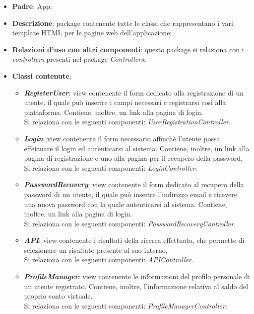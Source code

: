 \begin{itemize}
	\item \textbf{Padre}: App;
	
	\item \textbf{Descrizione}: package contenente tutte le classi che rappresentano i vari template HTML per le pagine web dell'applicazione;
	
	\item \textbf{Relazioni d’uso con altri componenti}: questo package si relaziona con i \textit{controllers} presenti nel package \textit{Controllers};
	
	\item \textbf{Classi contenute}:
	\begin{itemize}
		\item \textbf{\textit{RegisterUser}}: view contenente il form dedicato alla registrazione di un utente, il quale può inserire i campi necessari e registrarsi così alla piattaforma. Contiene, inoltre, un link alla pagina di login.\\
		Si relaziona con le seguenti componenti: \textit{UserRegistrationController}.
		
		\item \textbf{\textit{Login}}: view contenente il form necessario affinchè l'utente possa effettuare il login ed autenticarsi al sistema. Contiene, inoltre, un link alla pagina di registrazione e uno alla pagina per il recupero della password.\\
		Si relaziona con le seguenti componenti: \textit{LoginController}.
		
		\item \textbf{\textit{PasswordRecovery}}: view contenente il form dedicato al recupero della password di un utente, il quale può inserire l'indirizzo email e ricevere una nuova password con la quale autenticarsi al sistema. Contiene, inoltre, un link alla pagina di login.\\
		Si relaziona con le seguenti componenti: \textit{PasswordRecoveryController}.
		
		\item \textbf{\textit{API}}: view contenente i risultati della ricerca effettuata, che permette di selezionare un risultato presente al suo interno.\\
		Si relaziona con le seguenti componenti: \textit{APIController}.
		
		\item \textbf{\textit{ProfileManager}}: view contenente le informazioni del profilo personale di un utente registrato. Contiene, inoltre, l'informazione relativa al saldo del proprio conto virtuale.\\
		Si relaziona con le seguenti componenti: \textit{ProfileManagerController}.
		

\end{itemize}
\end{itemize}
